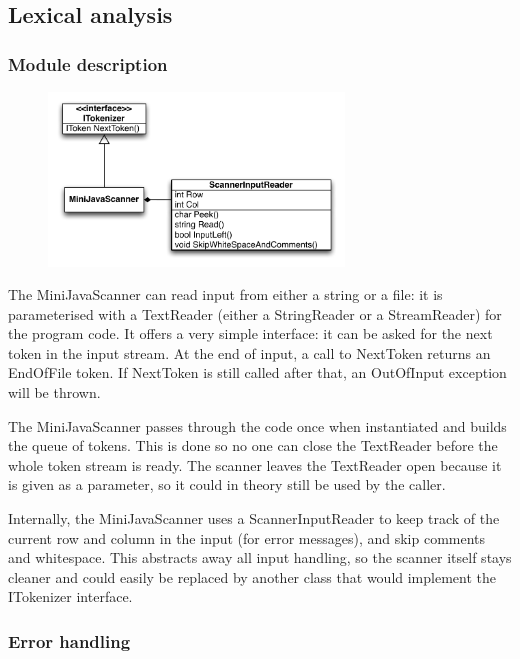 \documentclass[a4paper,11pt]{article}
\begin{document}
\subsection{Lexical analysis}

\subsubsection{Module description}

\begin{figure}[h!]
\centering
\includegraphics[width=0.7\textwidth]{lexical_analysis.pdf}
\end{figure}

The MiniJavaScanner can read input from either a string or a file: it is parameterised with a TextReader (either a StringReader or a StreamReader) for the program code. It offers a very simple interface: it can be asked for the next token in the input stream. At the end of input, a call to NextToken returns an EndOfFile token. If NextToken is still called after that, an OutOfInput exception will be thrown.

The MiniJavaScanner passes through the code once when instantiated and builds the queue of tokens. This is done so no one can close the TextReader before the whole token stream is ready. The scanner leaves the TextReader open because it is given as a parameter, so it could in theory still be used by the caller.

Internally, the MiniJavaScanner uses a ScannerInputReader to keep track of the current row and column in the input (for error messages), and skip comments and whitespace. This abstracts away all input handling, so the scanner itself stays cleaner and could easily be replaced by another class that would implement the ITokenizer interface.

\subsubsection{Error handling}
\end{document}
